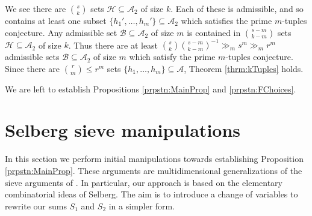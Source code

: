 \documentclass[12pt,a4paper]{amsart}
\theoremstyle{plain}
\numberwithin{sblmm}{thrm}
\numberwithin{equation}{section}
\begin{document}
We see there are $\binom{s}{k}$ sets $\mathcal{H}\subseteq\mathcal{A}_2$ of size $k$. Each of these is admissible, and so contains at least one subset $\{h_1',\dotsc,h_m'\}\subseteq\mathcal{A}_2$ which satisfies the prime $m$-tuples conjecture. Any admissible set $\mathcal{B}\subseteq\mathcal{A}_2$ of size $m$ is contained in $\binom{s-m}{k-m}$ sets $\mathcal{H}\subseteq\mathcal{A}_2$ of size $k$. Thus there are at least $\binom{s}{k}\binom{s-m}{k-m}^{-1}\gg_m s^m\gg_m r^m$ admissible sets $\mathcal{B}\subseteq\mathcal{A}_2$ of size $m$ which satisfy the prime $m$-tuples conjecture. Since there are $\binom{r}{m}\le r^m$ sets $\{h_1,\dotsc,h_m\}\subseteq\mathcal{A}$, Theorem \ref{thrm:kTuples} holds.

We are left to establish Propositions \ref{prpstn:MainProp} and \ref{prpstn:FChoices}.
\section{Selberg sieve manipulations}
In this section we perform initial manipulations towards establishing Proposition \ref{prpstn:MainProp}. These arguments are multidimensional generalizations of the sieve arguments of \cite{GGPY}. In particular, our approach is based on the elementary combinatorial ideas of Selberg. The aim is to introduce a change of variables to rewrite our sums $S_1$ and $S_2$ in a simpler form.
\end{document}
